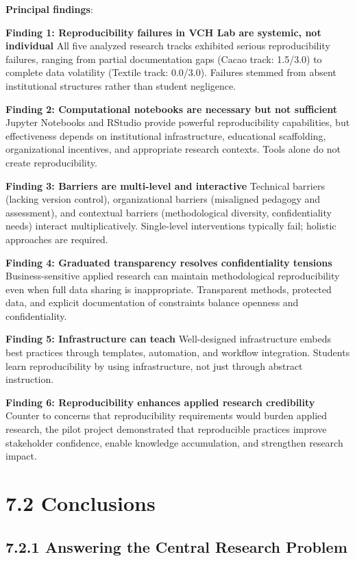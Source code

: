 \documentclass[
  oneside,
  open=any]{scrbook}
\begin{document}
\textbf{Principal findings}:

\textbf{Finding 1: Reproducibility failures in VCH Lab are systemic, not
individual} All five analyzed research tracks exhibited serious
reproducibility failures, ranging from partial documentation gaps (Cacao
track: 1.5/3.0) to complete data volatility (Textile track: 0.0/3.0).
Failures stemmed from absent institutional structures rather than
student negligence.

\textbf{Finding 2: Computational notebooks are necessary but not
sufficient} Jupyter Notebooks and RStudio provide powerful
reproducibility capabilities, but effectiveness depends on institutional
infrastructure, educational scaffolding, organizational incentives, and
appropriate research contexts. Tools alone do not create
reproducibility.

\textbf{Finding 3: Barriers are multi-level and interactive} Technical
barriers (lacking version control), organizational barriers (misaligned
pedagogy and assessment), and contextual barriers (methodological
diversity, confidentiality needs) interact multiplicatively.
Single-level interventions typically fail; holistic approaches are
required.

\textbf{Finding 4: Graduated transparency resolves confidentiality
tensions} Business-sensitive applied research can maintain
methodological reproducibility even when full data sharing is
inappropriate. Transparent methods, protected data, and explicit
documentation of constraints balance openness and confidentiality.

\textbf{Finding 5: Infrastructure can teach} Well-designed
infrastructure embeds best practices through templates, automation, and
workflow integration. Students learn reproducibility by using
infrastructure, not just through abstract instruction.

\textbf{Finding 6: Reproducibility enhances applied research
credibility} Counter to concerns that reproducibility requirements would
burden applied research, the pilot project demonstrated that
reproducible practices improve stakeholder confidence, enable knowledge
accumulation, and strengthen research impact.

\section{7.2 Conclusions}\label{conclusions}

\subsection{7.2.1 Answering the Central Research
Problem}\label{answering-the-central-research-problem}
\end{document}
